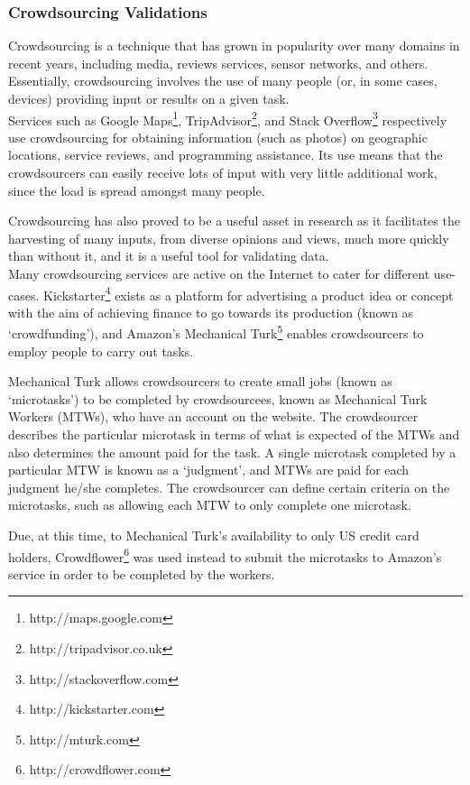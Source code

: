\subsubsection{Crowdsourcing Validations}
Crowdsourcing is a technique that has grown in popularity over many domains in recent years, including  media, reviews services, sensor networks, and others. Essentially, crowdsourcing involves the use of many people (or, in some cases, devices) providing input or results on a given task.\\
Services such as Google Maps\footnote{http://maps.google.com}, TripAdvisor\footnote{http://tripadvisor.co.uk}, and Stack Overflow\footnote{http://stackoverflow.com} respectively use crowdsourcing for obtaining information (such as photos) on geographic locations, service reviews, and programming assistance. Its use means that the crowdsourcers can easily receive lots of input with very little additional work, since the load is spread amongst many people.

Crowdsourcing has also proved to be a useful asset in research as it facilitates the harvesting of many inputs, from diverse opinions and views, much more quickly than without it, and it is a useful tool for validating data.\\
Many crowdsourcing services are active on the Internet to cater for different use-cases. Kickstarter\footnote{http://kickstarter.com} exists as a platform for advertising a product idea or concept with the aim of achieving finance to go towards its production (known as `crowdfunding'), and Amazon's Mechanical Turk\footnote{http://mturk.com} enables crowdsourcers to employ people to carry out tasks.

Mechanical Turk allows crowdsourcers to create small jobs (known as `microtasks') to be completed by crowdsourcees, known as Mechanical Turk Workers (MTWs), who have an account on the website. The crowdsourcer describes the particular microtask in terms of what is expected of the MTWs and also determines the amount paid for the task. A single microtask completed by a particular MTW is known as a `judgment', and MTWs are paid for each judgment he/she completes. The crowdsourcer can define certain criteria on the microtasks, such as allowing each MTW to only complete one microtask.

Due, at this time, to Mechanical Turk's availability to only US credit card holders, Crowdflower\footnote{http://crowdflower.com} was used instead to submit the microtasks to Amazon's service in order to be completed by the workers. 


